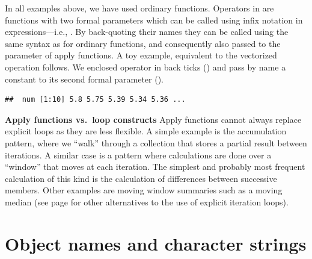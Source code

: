 \documentclass[krantz2]{krantz}\usepackage{knitr}
\begin{document}
In all examples above, we have used ordinary functions. Operators in \Rlang are functions with two formal parameters which can be called using infix notation in expressions---i.e., . By back-quoting their names they can be called using the same syntax as for ordinary functions, and consequently also passed to the  parameter of apply functions. A toy example, equivalent to the vectorized operation  follows. We enclosed operator \code{+} in back ticks () and pass by name a constant to its second formal parameter ().

\begin{knitrout}\footnotesize
{}\color{fgcolor}\begin{kframe}
\begin{alltt}
\hlstd{(}\hlstd{)} 
 \hlkwb{<-} \hlstd{(}\hlstd{)}
 \hlkwb{<-} \hlstd{(}     \hlstd{=} \hlstd{)}
\end{alltt}
\begin{verbatim}
##  num [1:10] 5.8 5.75 5.39 5.34 5.36 ...
\end{verbatim}
\end{kframe}
\end{knitrout}

\begin{explainbox}
\textbf{Apply functions vs.\ loop constructs} Apply functions cannot always replace explicit loops as they are less flexible. A simple example is the accumulation pattern, where we ``walk'' through a collection that stores a partial result between iterations. A similar case is a pattern where calculations are done over a ``window'' that moves at each iteration. The simplest and probably most frequent calculation of this kind is the calculation of differences between successive members. Other examples are moving window summaries such as a moving median (see page \pageref{box:vectorization:perf} for other alternatives to the use of explicit iteration loops).
\end{explainbox}

\section{Object names and character strings}
\end{document}
